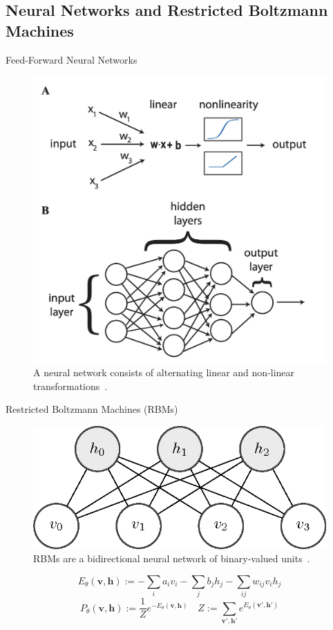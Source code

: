 \documentclass{beamer}
\newcommand{\bolds}[1]{\boldsymbol{#1}}
\newcommand{\bh}{\bolds{h}}
\newcommand{\bv}{\bolds{v}}
\begin{document}
\subsection{Neural Networks and Restricted Boltzmann Machines}
\begin{frame}{Feed-Forward Neural Networks}
  \begin{figure}[ht]
    \centering \includegraphics[width=0.7\linewidth]{figures/ffnn.png}
    \caption{A neural network consists of alternating linear and
      non-linear transformations~\cite{mehta-review}.}
  \end{figure}
\end{frame}

\begin{frame}{Restricted Boltzmann Machines (RBMs)}
  \begin{figure}[ht]
    \centering \includegraphics[width=0.7\linewidth]{figures/rbm.png}
    \caption{RBMs are a bidirectional neural network of binary-valued
      units~\cite{rbm-1}.}
  \end{figure}
  \begin{equation*}%
    \boxed{E_\theta(\bv, \bh):=-\sum_i a_iv_i -\sum_j b_jh_j-\sum_{ij} w_{ij}v_ih_j \label{eq:rbm-energy-fn}}
  \end{equation*}
  \begin{equation*}%
    \boxed{P_\theta(\bv,\bh):=\frac{1}{Z}e^{-E_\theta(\bv,\bh)}\quad
      Z:=\sum_{\bv',\bh'}e^{E_\theta(\bv', \bh')}\label{eq:rbm-joint-dist}}
  \end{equation*}%
\end{frame}
\end{document}
